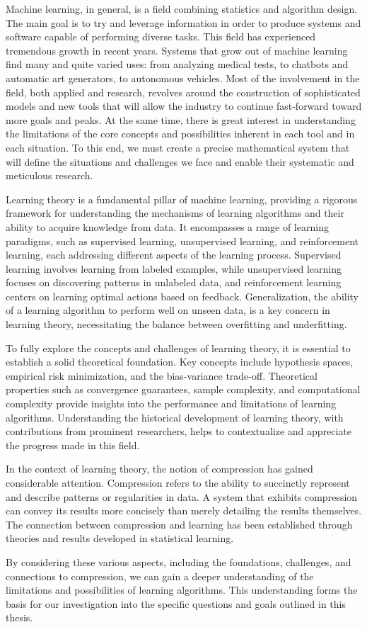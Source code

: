 Machine learning, in general, is a field combining statistics and algorithm design. The main goal is to try and leverage information in order to produce systems and software capable of performing diverse tasks. This field has experienced tremendous growth in recent years. Systems that grow out of machine learning find many and quite varied uses: from analyzing medical tests, to chatbots and automatic art generators, to autonomous vehicles. Most of the involvement in the field, both applied and research, revolves around the construction of sophisticated models and new tools that will allow the industry to continue fast-forward toward more goals and peaks. At the same time, there is great interest in understanding the limitations of the core concepts and possibilities inherent in each tool and in each situation. To this end, we must create a precise mathematical system that will define the situations and challenges we face and enable their systematic and meticulous research.

Learning theory is a fundamental pillar of machine learning, providing a rigorous framework for understanding the mechanisms of learning algorithms and their ability to acquire knowledge from data. It encompasses a range of learning paradigms, such as supervised learning, unsupervised learning, and reinforcement learning, each addressing different aspects of the learning process. Supervised learning involves learning from labeled examples, while unsupervised learning focuses on discovering patterns in unlabeled data, and reinforcement learning centers on learning optimal actions based on feedback. Generalization, the ability of a learning algorithm to perform well on unseen data, is a key concern in learning theory, necessitating the balance between overfitting and underfitting.

To fully explore the concepts and challenges of learning theory, it is essential to establish a solid theoretical foundation. Key concepts include hypothesis spaces, empirical risk minimization, and the bias-variance trade-off. Theoretical properties such as convergence guarantees, sample complexity, and computational complexity provide insights into the performance and limitations of learning algorithms. Understanding the historical development of learning theory, with contributions from prominent researchers, helps to contextualize and appreciate the progress made in this field.

In the context of learning theory, the notion of compression has gained considerable attention. Compression refers to the ability to succinctly represent and describe patterns or regularities in data. A system that exhibits compression can convey its results more concisely than merely detailing the results themselves. The connection between compression and learning has been established through theories and results developed in statistical learning.

By considering these various aspects, including the foundations, challenges, and connections to compression, we can gain a deeper understanding of the limitations and possibilities of learning algorithms. This understanding forms the basis for our investigation into the specific questions and goals outlined in this thesis.

